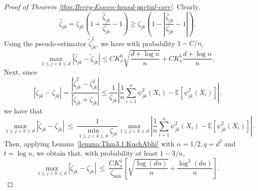 \documentclass[11pt]{article}
\begin{document}
\begin{appendices}
\begin{proof}[Proof of Theorem \ref{thm:Berry-Esseen-bound-partial-corr}]
Clearly,
\begin{equation}\label{eq:bound-hat.sigma-sigma}
\widehat{\zeta}_{jk} = \zeta_{jk}\left(1 + \frac{\widehat{\zeta}_{jk}}{\zeta_{jk}} - 1\right) \ge \zeta_{jk}\left(1 - \left|\frac{\widehat{\zeta}_{jk}}{\zeta_{jk}} - 1\right|\right).
\end{equation}
Using the pseudo-estimator $\widetilde{\zeta}_{jk}^2$, we have with probability $1 - C/n$,
\begin{equation}\label{eq:sigma-hat-to-sigma-tilde}
\max_{1\le j < k\le d}|\widehat{\zeta}_{jk} - \widetilde{\zeta}_{jk}| \le CK_x^6\sqrt{\frac{d + \log n}{n}} + CK_x^5\frac{d + \log n}{n},
\end{equation}
Next, since
\[
\left|\widetilde{\zeta}_{jk} - \zeta_{jk}\right| = \frac{|\widetilde{\zeta}_{jk}^2 - \zeta_{jk}^2|}{|\widetilde{\zeta}_{jk} + \zeta_{jk}|} \le \frac{1}{\zeta_{jk}}\left|\frac{1}{n}\sum_{i=1}^n \psi_{jk}^2(X_i) - \mathbb{E}[\psi_{jk}^2(X_i)]\right|.
\]
we have that
\[
\max_{1\le j < k\le d}\left|\widetilde{\zeta}_{jk} - \zeta_{jk}\right| ~\le~ \frac{1}{\min_{1\le j < k\le d}\zeta_{jk}}\max_{1\le j < k\le d}\left|\frac{1}{n}\sum_{i=1}^n \psi_{jk}^2(X_i) - \mathbb{E}[\psi_{jk}^2(X_i)]\right|.
\]
Then, applying  Lemma~\ref{lemma:Thm3.1.KuchAbhi} with $\alpha = 1/2, q = d^2$ and $t = \log n$,  we obtain that, with probability at least $1 - 3/n$,
\begin{equation}\label{eq:sigma-tilde-to-sigma}
\max_{1\le j < k\le d}\left|\widetilde{\zeta}_{jk} - \zeta_{jk}\right| ~\le~ \frac{CK_x^4}{\zeta_{\min}}\left[\sqrt{\frac{\log(dn)}{n}} + \frac{\log^2(dn)}{n}\right].
\end{equation}



\end{proof}
\end{appendices}
\end{document}
